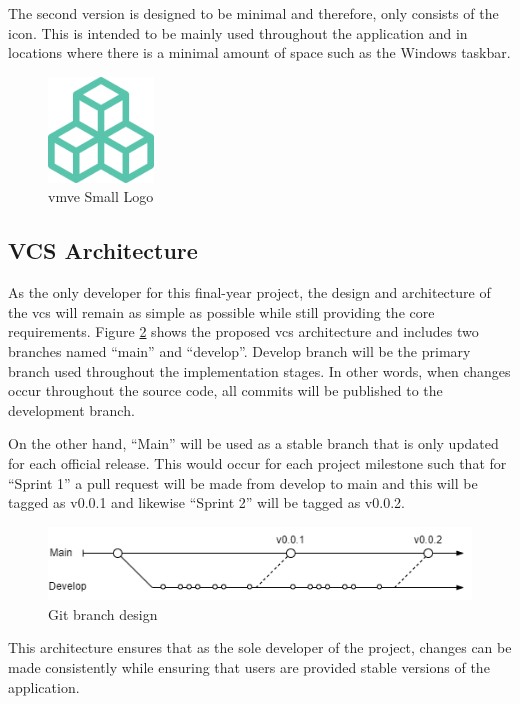 \documentclass[11pt]{article}
\begin{document}
The second version is designed to be minimal and therefore, only consists of the
icon. This is intended to be mainly used throughout the application and in
locations where there is a minimal amount of space such as the Windows taskbar.
\begin{figure}[H]
  \centering
  \includegraphics[width=0.25\textwidth]{images/project_icon.png}
  \caption{\gls*{vmve} Small Logo}
  \label{fig:project_logo_small}
\end{figure}


\subsection{VCS Architecture}
As the only developer for this final-year project, the design and architecture
of the \gls*{vcs} will remain as simple as possible while still providing the
core requirements. Figure \ref{fig:brancharch} shows the proposed \gls*{vcs}
architecture and includes two branches named ``main'' and ``develop''. Develop
branch will be the primary branch used throughout the implementation stages. In
other words, when changes occur throughout the source code, all commits will be
published to the development branch.

On the other hand, ``Main'' will be used as a stable branch that is only updated
for each official release. This would occur for each project milestone such that
for ``Sprint 1'' a pull request will be made from develop to main and this will
be tagged as v0.0.1 and likewise ``Sprint 2'' will be tagged as v0.0.2.

\begin{figure}[H]
  \centering
  \includegraphics[width=\textwidth]{images/current_branch_design.png}
  \caption{Git branch design}
  \label{fig:brancharch}
\end{figure}

This architecture ensures that as the sole developer of the project, changes can
be made consistently while ensuring that users are provided stable versions of
the application.
\end{document}
